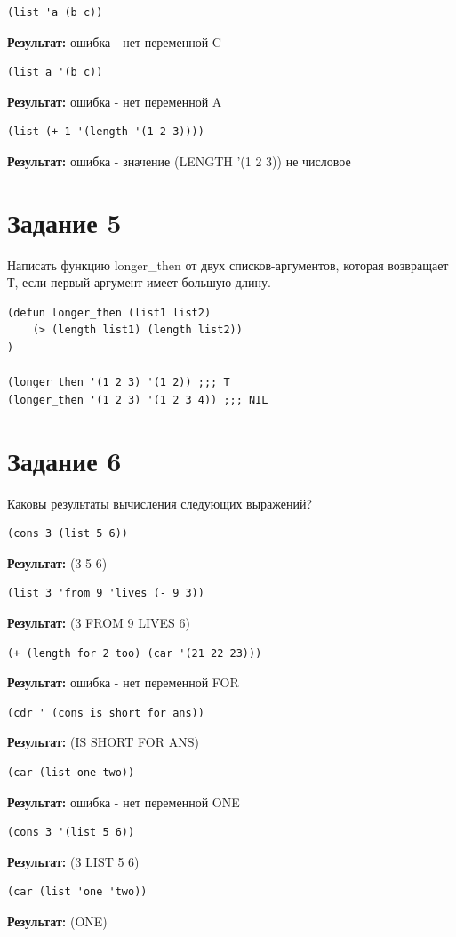 \begin{lstlisting}
(list 'a (b c))
\end{lstlisting}
\textbf{Результат:} ошибка - нет переменной C

\begin{lstlisting}
(list a '(b c))
\end{lstlisting}
\textbf{Результат:} ошибка - нет переменной A

\begin{lstlisting}
(list (+ 1 '(length '(1 2 3))))
\end{lstlisting}
\textbf{Результат:} ошибка - значение (LENGTH '(1 2 3)) не числовое

\section{Задание \No{}5}
Написать функцию longer\_then от двух списков-аргументов,
которая возвращает Т, если первый аргумент имеет большую длину.

\begin{lstlisting}
(defun longer_then (list1 list2)
    (> (length list1) (length list2))
)

(longer_then '(1 2 3) '(1 2)) ;;; T
(longer_then '(1 2 3) '(1 2 3 4)) ;;; NIL
\end{lstlisting}

\section{Задание \No{}6}
Каковы результаты вычисления следующих выражений?

\begin{lstlisting}
(cons 3 (list 5 6))
\end{lstlisting}
\textbf{Результат:} (3 5 6)

\begin{lstlisting}
(list 3 'from 9 'lives (- 9 3))
\end{lstlisting}
\textbf{Результат:} (3 FROM 9 LIVES 6)

\begin{lstlisting}
(+ (length for 2 too) (car '(21 22 23)))
\end{lstlisting}
\textbf{Результат:} ошибка - нет переменной FOR

\begin{lstlisting}
(cdr ' (cons is short for ans))
\end{lstlisting}
\textbf{Результат:} (IS SHORT FOR ANS)

\begin{lstlisting}
(car (list one two))
\end{lstlisting}
\textbf{Результат:} ошибка - нет переменной ONE

\begin{lstlisting}
(cons 3 '(list 5 6))
\end{lstlisting}
\textbf{Результат:} (3 LIST 5 6)

\begin{lstlisting}
(car (list 'one 'two))
\end{lstlisting}
\textbf{Результат:} (ONE)
